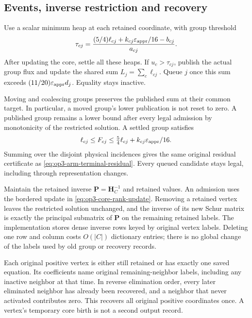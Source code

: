 \subsection{Events, inverse restriction and recovery}

Use a scalar minimum heap at each retained coordinate, with group threshold
\begin{equation}
 \tau_{cj}=\frac{(5/4)\ell_{cj}+k_{cj}\varepsilon_{\mathrm{appr}}/16-b_{cj}}{a_{cj}}.
 \label{eq:op3-grouped-flux-threshold}
\end{equation}
After updating the core, settle all these heaps. If $u_c>\tau_{cj}$,
publish the actual group flux and update the shared sum
$L_j=\sum_c\ell_{cj}$. Queue $j$ once this sum exceeds
$(11/20)\varepsilon_{\mathrm{appr}} d_j$. Equality stays inactive.

Moving and coalescing groups preserves the published sum at their common
target. In particular, a moved group's lower publication is not reset to
zero. A published group remains a lower bound after every legal admission
by monotonicity of the restricted solution. A settled group satisfies
\[
 \ell_{cj}\leq F_{cj}\leq\tfrac54\ell_{cj}
                  +k_{cj}\varepsilon_{\mathrm{appr}}/16.
\]
Summing over the disjoint physical incidences gives the same original
residual certificate as \cref{eq:op3-arm-terminal-residual}. Every queued
candidate stays legal, including through representation changes.

Maintain the retained inverse $\bm P=\bm H_C^{-1}$ and retained values.
An admission uses the bordered update in
\cref{eq:op3-core-rank-update}. Removing a retained vertex leaves the
restricted solution unchanged, and the inverse of its new Schur matrix is
exactly the principal submatrix of $\bm P$ on the remaining retained labels.
The implementation stores dense inverse rows keyed by original vertex
labels. Deleting one row and column costs $O(|C|)$ dictionary entries;
there is no global change of the labels used by old group or recovery records.

Each original positive vertex is either still retained or has exactly one
saved equation. Its coefficients name original remaining-neighbor labels,
including any inactive neighbor at that time. In reverse elimination order,
every later eliminated neighbor has already been recovered, and a neighbor
that never activated contributes zero. This recovers all original positive
coordinates once. A vertex's temporary core birth is not a second output
record.

